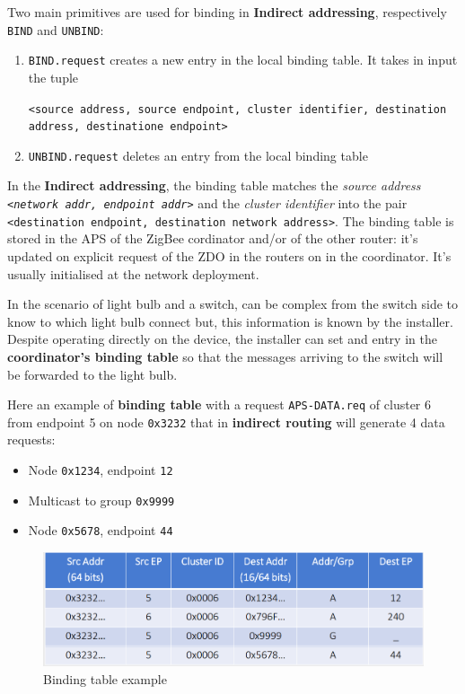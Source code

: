 \documentclass[10pt,a4paper]{report}
\theoremstyle{definition}
\begin{document}
Two main primitives are used for binding in \textbf{Indirect addressing}, respectively \texttt{BIND} and \texttt{UNBIND}:
\begin{enumerate}
	\item 
	\texttt{BIND.request} creates a new entry in the local binding table. It takes in input the tuple 
	\begin{center}
		\texttt{<source address, source endpoint, cluster identifier, destination address, destinatione endpoint>}
	\end{center}
	
	\item 
	\texttt{UNBIND.request} deletes an entry from the local binding table
\end{enumerate}

In the \textbf{Indirect addressing}, the binding table matches the \textit{source address \texttt{<network addr, endpoint addr>}} and the \textit{cluster identifier} into the pair \texttt{<destination endpoint, destination network address>}. The binding table is stored in the APS of the ZigBee cordinator and/or of the other router: it's updated on explicit request of the ZDO in the routers on in the coordinator. It's usually initialised at the network deployment.

In the scenario of light bulb and a switch, can be complex from the switch side to know to which light bulb connect but, this information is known by the installer. Despite operating directly on the device, the installer can set and entry in the \textbf{coordinator's binding table} so that the messages arriving to the switch will be forwarded to the light bulb.

Here an example of \textbf{binding table} with a request \texttt{APS-DATA.req} of cluster 6 from endpoint 5 on node \texttt{0x3232} that in \textbf{indirect routing} will generate 4 data requests:
\begin{itemize}
	\item 
	Node \texttt{0x1234}, endpoint \texttt{12}
	\item 
	Multicast to group \texttt{0x9999}
	\item 
	Node \texttt{0x5678}, endpoint \texttt{44}
\end{itemize}

\begin{figure}[h]
	\centering\includegraphics[scale=0.30]{images/Pasted image 20230311163416.png}
	\caption{Binding table example}
	\label{zigbee-binding-table}
\end{figure}
\end{document}
